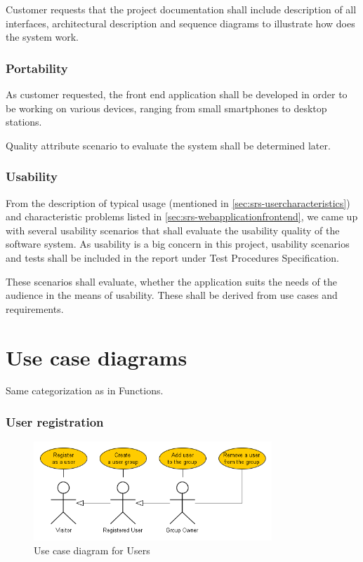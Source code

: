 \documentclass[11pt]{book}
\begin{document}
Customer requests that the project documentation shall include description of all interfaces, architectural description and sequence diagrams to illustrate how does the system work.

\subsubsection{Portability}
As customer requested, the front end application shall be developed in order to be working on various devices, ranging from small smartphones to desktop stations.

Quality attribute scenario to evaluate the system shall be determined later.

\subsubsection{Usability}\label{sec:usability}
From the description of typical usage (mentioned in \ref{sec:srs-usercharacteristics}) and characteristic problems listed in \ref{sec:srs-webapplicationfrontend}, we came up with several usability scenarios that shall evaluate the usability quality of the software system. As usability is a big concern in this project, usability scenarios and tests shall be included in the report under Test Procedures Specification.  %

These scenarios shall evaluate, whether the application suits the needs of the audience in the means of usability. These shall be derived from use cases and requirements.

\section{Use case diagrams}
Same categorization as in Functions. 

\subsubsection{User registration}
\begin{figure}[H]
      \centering
      \includegraphics[width=0.8\textwidth]{Figures/Requirements/users.png} %
      \caption{Use case diagram for Users}
      \label{fig:req_usecase_users}
\end{figure}
\end{document}
